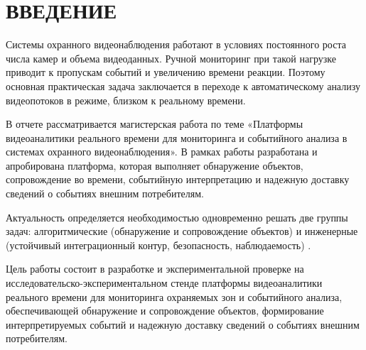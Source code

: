 \chapter*{ВВЕДЕНИЕ}

Системы охранного видеонаблюдения работают в условиях постоянного роста числа камер и объема видеоданных. Ручной мониторинг при такой нагрузке приводит к пропускам событий и увеличению времени реакции. Поэтому основная практическая задача заключается в переходе к автоматическому анализу видеопотоков в режиме, близком к реальному времени.

В отчете рассматривается магистерская работа по теме «Платформы видеоаналитики реального времени для мониторинга и событийного анализа в системах охранного видеонаблюдения». В рамках работы разработана и апробирована платформа, которая выполняет обнаружение объектов, сопровождение во времени, событийную интерпретацию и надежную доставку сведений о событиях внешним потребителям.

Актуальность определяется необходимостью одновременно решать две группы задач: алгоритмические (обнаружение и сопровождение объектов) и инженерные (устойчивый интеграционный контур, безопасность, наблюдаемость) \cite{redmon2016yolo,wojke2017deepsort,transactional_outbox}.

Цель работы состоит в разработке и экспериментальной проверке на исследовательско-экспериментальном стенде платформы видеоаналитики реального времени для мониторинга охраняемых зон и событийного анализа, обеспечивающей обнаружение и сопровождение объектов, формирование интерпретируемых событий и надежную доставку сведений о событиях внешним потребителям.

